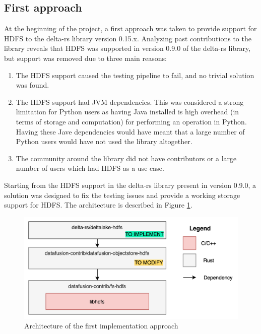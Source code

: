 \subsection{First approach}
At the beginning of the project, a first approach was taken to provide support for \gls{HDFS} to the delta-rs library version 0.15.x. Analyzing past contributions to the library reveals that \gls{HDFS} was supported in version 0.9.0 of the delta-rs library, but support was removed due to three main reasons:
\begin{enumerate}
  \item The \gls{HDFS} support caused the testing pipeline to fail, and no trivial solution was found.
  \item The \gls{HDFS} support had \gls{JVM} dependencies. This was considered a strong limitation for Python users as having Java installed is high overhead (in terms of storage and computation) for performing an operation in Python. Having these Jave dependencies would have meant that a large number of Python users would have not used the library altogether.
  \item The community around the library did not have contributors or a large number of users which had \gls{HDFS} as a use case.
\end{enumerate}
Starting from the \gls{HDFS} support in the delta-rs library present in version 0.9.0, a solution was designed to fix the testing issues and provide a working storage support for \gls{HDFS}. The architecture is described in Figure \ref{fig:approach_1_solution_schema}. 

\begin{figure}[!ht]
  \begin{center}
    \includegraphics[width=\textwidth]{figures/4-implementation/approach1_solution_schema.png}
  \caption{Architecture of the first implementation approach}
  \label{fig:approach_1_solution_schema}
  \end{center}
\end{figure}


